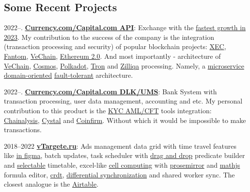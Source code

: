 \documentclass{yb}
\begin{document}
\subsection*{Some Recent Projects}

2022--. \href{https://currency.com/}{\textbf{Currency.com/Capital.com API}}: Exchange with the \href{https://financefeeds.com/who-won-the-forexbrokers-com-2023-annual-awards/}{fastest growth in 2023}. My contribution to the success of the company is the integration (transaction processing and security) of popular blockchain projects: \href{https://currency.com/ecash-xec-price-prediction}{XEC}, \href{https://currency.com/fantom-ftm-news-price-analysis}{Fantom}, \href{https://currency.com/what-is-vechain-your-ultimate-guide}{VeChain}, \href{https://currency.com/eth-2-0-what-s-happened-so-far-and-when-is-the-next-phase}{Ethereum 2.0}. And most importantly - architecture of \href{https://github.com/vechain/connex}{VeChain}, \href{https://github.com/cosmos/cosmjs}{Cosmos}, \href{https://github.com/polkadot-js/api}{Polkadot}, \href{https://github.com/tronprotocol/tronweb}{Tron} and \href{https://github.com/Zilliqa/zilliqa-js}{Zilliqa} processing. Namely, a \href{https://microservices.io/patterns/microservices.html}{microservice} \href{https://thedomaindrivendesign.io/distilling-domain/}{domain-oriented} \href{https://microservices.io/patterns/data/transactional-outbox.html}{fault-tolerant} architecture.

2022--. \href{https://currency.com/}{\textbf{Currency.com/Capital.com DLK/UMS}}: Bank System with transaction processing, user data management, accounting and etc. My personal contribution to this product is the \href{https://en.wikipedia.org/wiki/Know_your_customer}{KYC AML/CFT} tools integration: \href{https://demo.chainalysis.com/request-a-demo/}{Chainalysis}, \href{https://crystalblockchain.com/}{Cystal} and \href{https://www.coinfirm.com/}{Coinfirm}. Without which it would be impossible to make transactions.

2018--2022 \href{https://vtargete.ru/}{\textbf{vTargete.ru}}: Ads management data grid 
with time travel features like \href{https://www.figma.com/blog/how-figmas-multiplayer-technology-works/}{in figma}, 
batch updates, 
task scheduler with \href{https://sortablejs.github.io/Sortable/}{drag and drop} predicate builder and \href{https://simonwep.github.io/selection/}{selectable} timetable, 
excel-like  \href{https://www.sciencedirect.com/topics/computer-science/calculation-formula}{cell computing} with \href{https://prosemirror.net/}{prosemirror} and \href{https://mathjs.org/}{mathjs} formula editor, \href{https://en.wikipedia.org/wiki/Conflict-free_replicated_data_type}{crdt}, \href{https://static.googleusercontent.com/media/research.google.com/ru//pubs/archive/35605.pdf}{differential synchronization} and shared worker sync. The closest analogue is the \href{https://www.airtable.com/}{Airtable}.
\end{document}
